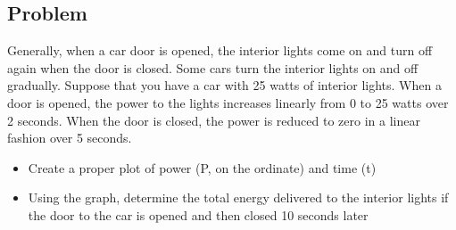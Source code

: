 \documentclass[a4paper, 10pt]{article}
\begin{document}
		\subsection{Problem}
			\noindent Generally, when a car door is opened, the interior lights come on and turn off again when the door is closed. Some cars turn the interior lights on and off gradually. Suppose that you have a car with 25 watts of interior lights. When a door is opened, the power to the lights increases linearly from 0 to 25 watts over 2 seconds. When the door is closed, the power is reduced to zero in a linear fashion over 5 seconds.
			
			\begin{itemize}
				\item Create a proper plot of power (P, on the ordinate) and time (t)
				\item Using the graph, determine the total energy delivered to the interior lights if the door to the car is opened and then closed 10 seconds later
			\end{itemize}
\end{document}
